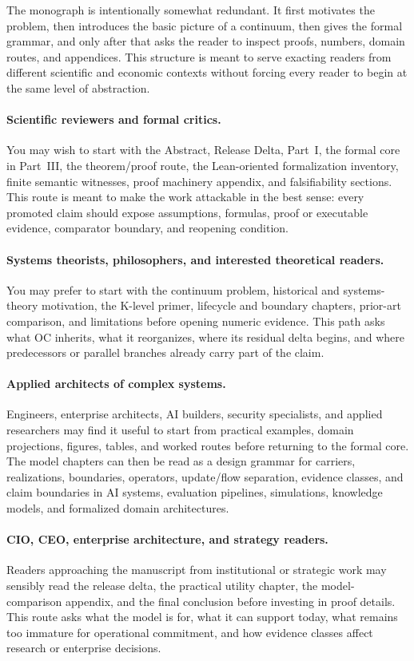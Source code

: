 The monograph is intentionally somewhat redundant. It first motivates the
problem, then introduces the basic picture of a continuum, then gives the
formal grammar, and only after that asks the reader to inspect proofs, numbers,
domain routes, and appendices. This structure is meant to serve exacting
readers from different scientific and economic contexts without forcing every
reader to begin at the same level of abstraction.

\paragraph{Scientific reviewers and formal critics.}
You may wish to start with the Abstract, Release Delta, Part~I, the formal core
in Part~III, the theorem/proof route, the Lean-oriented formalization inventory, finite semantic
witnesses, proof machinery appendix, and falsifiability sections. This route is
meant to make the work attackable in the best sense: every promoted claim
should expose assumptions, formulas, proof or executable evidence, comparator
boundary, and reopening condition.

\paragraph{Systems theorists, philosophers, and interested theoretical readers.}
You may prefer to start with the continuum problem, historical and systems-
theory motivation, the K-level primer, lifecycle and boundary chapters,
prior-art comparison, and limitations before opening numeric evidence. This
path asks what OC inherits, what it reorganizes, where its residual delta
begins, and where predecessors or parallel branches already carry part of the
claim.

\paragraph{Applied architects of complex systems.}
Engineers, enterprise architects, AI builders, security specialists, and
applied researchers may find it useful to start from practical examples,
domain projections, figures, tables, and worked routes before returning to the
formal core. The model chapters can then be read as a design grammar for
carriers, realizations, boundaries, operators, update/flow separation, evidence
classes, and claim boundaries in AI systems, evaluation pipelines, simulations,
knowledge models, and formalized domain architectures.

\paragraph{CIO, CEO, enterprise architecture, and strategy readers.}
Readers approaching the manuscript from institutional or strategic work may
sensibly read the release delta, the practical utility chapter, the
model-comparison appendix, and the final conclusion before investing in proof
details. This route asks what the model is for, what it can support today, what
remains too immature for operational commitment, and how evidence classes
affect research or enterprise decisions.

